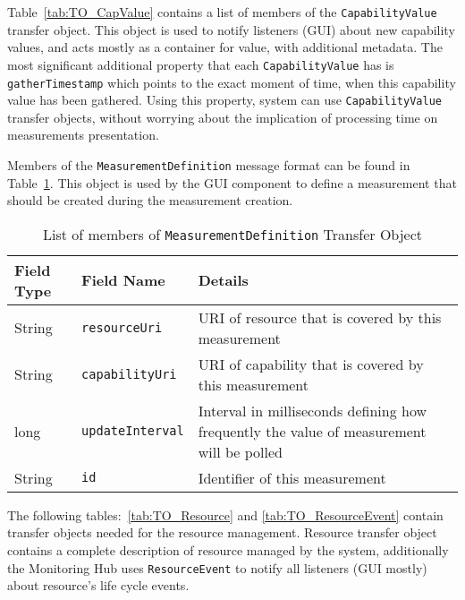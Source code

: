 Table~\ref{tab:TO_CapValue} contains a list of members of the \texttt{CapabilityValue} transfer object. This object is used to notify listeners (GUI) about new capability values, and acts mostly as a container for value, with additional metadata. The most significant additional property that each \texttt{CapabilityValue} has is \texttt{gatherTimestamp} which points to the exact moment of time, when this capability value has been gathered. Using this property, system can use \texttt{CapabilityValue} transfer objects, without worrying about the implication of processing time on measurements presentation.

Members of the \texttt{MeasurementDefinition} message format can be found in Table~\ref{tab:TO_MeasurementDef}. This object is used by the GUI component to define a measurement that should be created during the measurement creation.

\begin{table}[ht] %
\begin{tabular}{| m{} | m{} | m{} |}
\hline 
\cellcolor[gray]{0.9} Field Type & \cellcolor[gray]{0.9} Field Name & \cellcolor[gray]{0.9} Details \\
\hline 
String & \texttt{resourceUri} & URI of resource that is covered by this measurement \\
String & \texttt{capabilityUri} & URI of capability that is covered by this measurement \\
long & \texttt{updateInterval} & Interval in milliseconds defining how frequently the value of measurement will be polled \\
String & \texttt{id} & Identifier of this measurement \\ 
\hline 
\end{tabular}
\caption{List of members of \texttt{MeasurementDefinition} Transfer Object}
\label{tab:TO_MeasurementDef}
\end{table} %

The following tables:~\ref{tab:TO_Resource} and \ref{tab:TO_ResourceEvent} contain transfer objects needed for the resource management. Resource transfer object contains a complete description of resource managed by the system, additionally the Monitoring Hub uses \texttt{ResourceEvent} to notify all listeners (GUI mostly) about resource's life cycle events. 

